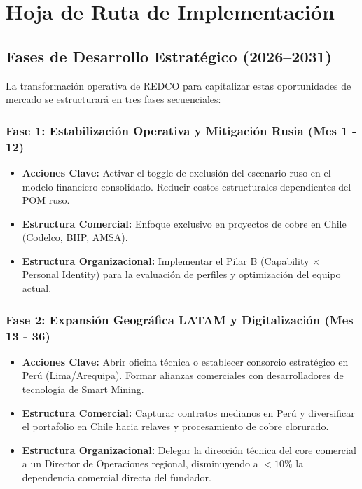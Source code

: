 \chapter{Hoja de Ruta de Implementación}

\section{Fases de Desarrollo Estratégico (2026--2031)}
La transformación operativa de REDCO para capitalizar estas oportunidades de mercado se estructurará en tres fases secuenciales:

\subsection{Fase 1: Estabilización Operativa y Mitigación Rusia (Mes 1 - 12)}
\begin{itemize}
    \item \textbf{Acciones Clave:} Activar el toggle de exclusión del escenario ruso en el modelo financiero consolidado. Reducir costos estructurales dependientes del POM ruso.
    \item \textbf{Estructura Comercial:} Enfoque exclusivo en proyectos de cobre en Chile (Codelco, BHP, AMSA).
    \item \textbf{Estructura Organizacional:} Implementar el Pilar B (Capability × Personal Identity) para la evaluación de perfiles y optimización del equipo actual.
\end{itemize}

\subsection{Fase 2: Expansión Geográfica LATAM y Digitalización (Mes 13 - 36)}
\begin{itemize}
    \item \textbf{Acciones Clave:} Abrir oficina técnica o establecer consorcio estratégico en Perú (Lima/Arequipa). Formar alianzas comerciales con desarrolladores de tecnología de Smart Mining.
    \item \textbf{Estructura Comercial:} Capturar contratos medianos en Perú y diversificar el portafolio en Chile hacia relaves y procesamiento de cobre clorurado.
    \item \textbf{Estructura Organizacional:} Delegar la dirección técnica del core comercial a un Director de Operaciones regional, disminuyendo a $<10\%$ la dependencia comercial directa del fundador.
\end{itemize}

